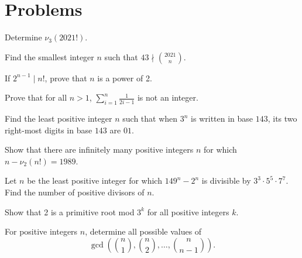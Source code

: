 \documentclass[mast]{lucky}
\begin{document}
\pagebreak
\section{Problems}



\begin{prob}[]{1}
Determine $\nu_3(2021!)$.
\end{prob}

\begin{prob}[]{1}
Find the smallest integer $n$ such that $43\nmid \binom{2021}n$.
\end{prob}

\begin{req}[Classic]{2}
If $2^{n-1}\mid n!$, prove that $n$ is a power of 2.
\end{req}

\begin{prob}[Classic]{2}
Prove that for all $n>1$, $\sum_{i=1}^n\frac1{2i-1}$ is not an integer.
\end{prob}

\begin{prob}[AIME I 2018/11]{3}
Find the least positive integer $n$ such that when $3^n$ is written in base $143$, its two right-most digits in base $143$ are $01$.
\end{prob}

\begin{prob}{3}
Show that there are infinitely many positive integers $n$ for which $n-\nu_2(n!)=1989$.
\end{prob}

\begin{req}[AIME I 2020/12]{4}
Let $n$ be the least positive integer for which $149^n - 2^n$ is divisible by $3^3 \cdot 5^5 \cdot 7^7$. Find the number of positive divisors of $n$.
\end{req}

\begin{prob}{4}
Show that 2 is a primitive root mod $3^k$ for all positive integers $k$.
\end{prob}

\begin{prob}[Classic]{4}
For positive integers $n$, determine all possible values of \[\gcd\left( \binom n1,\binom n2,\dots,\binom n{n-1} \right).\]
\end{prob}
\end{document}
